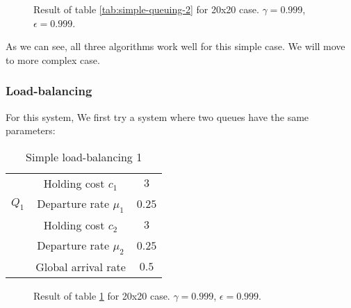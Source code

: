 \documentclass[
  a4paper, xcolor = usenames,dvipsnames]{article}
\begin{document}
\begin{figure}

{\centering {}

}

\caption{Result of table \ref{tab:simple-queuing-2} for 20x20 case. \(\gamma = 0.999\), \(\epsilon = 0.999\).}\label{fig:20x20-simple-queuing-2}
\end{figure}

As we can see, all three algorithms work well for this simple case. We will move to more complex case.

\hypertarget{load-balancing}{%
\subsubsection{Load-balancing}\label{load-balancing}}

For this system, We first try a system where two queues have the same parameters:

\begin{table}[ht]
\caption{Simple load-balancing 1}
\begin{center}
\begin{tabular}{c c c}
    \hline
    \multirow{3}{*}{$Q_{1}$} & Holding cost $c_{1}$ & $3$ \\
    & Departure rate $\mu_{1}$ & $0.25$ \\
    \cline{2-3}
    \multirow{3}{*}{$Q_{2}$} & Holding cost $c_{2}$ & $3$ \\
    & Departure rate $\mu_{2}$ & $0.25$ \\
    \cline{2-3}
    & Global arrival rate & $0.5$ \\    
    \hline
\end{tabular}
\end{center}
\label{tab:simple-lb-1}
\end{table}



\begin{figure}

{\centering {}

}

\caption{Result of table \ref{tab:simple-lb-1} for 20x20 case. \(\gamma = 0.999\), \(\epsilon = 0.999\).}\label{fig:20x20-simple-lb-1}
\end{figure}
\end{document}
